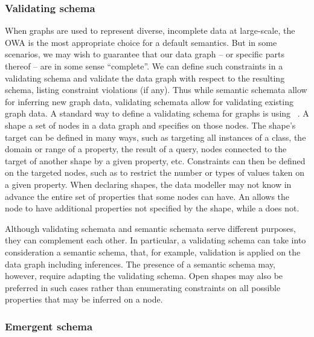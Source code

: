 \subsubsection{Validating schema}
When graphs are used to represent diverse, incomplete data at large-scale, the OWA is the most appropriate choice for a default semantics. But in some scenarios, we may wish to guarantee that our data graph – or specific parts thereof – are in some sense “complete”. We can define such constraints in a validating schema and validate the data graph with respect to the resulting schema, listing constraint violations (if any). Thus while semantic schemata allow for inferring new graph data, validating schemata allow for validating existing graph data. 
A standard way to define a validating schema for graphs is using ~\cite{Knublauch2017SHACL}\cite{LabraGayo2017ValidatingRDF}\cite{Prudhommeaux2014ShapeExpressions}. A shape  a set of nodes in a data graph and specifies  on those nodes. The shape’s target can be defined in many ways, such as targeting all instances of a class, the domain or range of a property, the result of a query, nodes connected to the target of another shape by a given property, etc. Constraints can then be defined on the targeted nodes, such as to restrict the number or types of values taken on a given property. When declaring shapes, the data modeller may not know in advance the entire set of properties that some nodes can have. An  allows the node to have additional properties not specified by the shape, while a  does not.

Although validating schemata and semantic schemata serve different purposes, they can complement each other. In particular, a validating schema can take into consideration a semantic schema, that, for example, validation is applied on the data graph including inferences. The presence of a semantic schema may, however, require adapting the validating schema. Open shapes may also be preferred in such cases rather than enumerating constraints on all possible properties that may be inferred on a node.

\subsubsection{Emergent schema}






